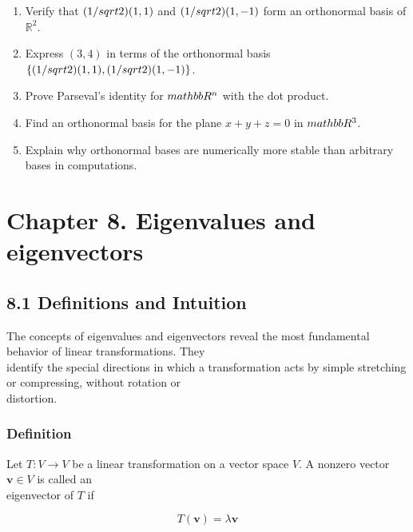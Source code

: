\documentclass[
  12pt,
  a4paper,
]{article}
\let\oldsection\section
\renewcommand{\section}{\clearpage\oldsection}
\begin{document}
\begin{enumerate}
\def\labelenumi{\arabic{enumi}.}
\item
  Verify that \((1/\\sqrt{2})(1,1)\) and \((1/\\sqrt{2})(1,-1)\) form an
  orthonormal basis of \(\mathbb{R}^2\).
\item
  Express \((3,4)\) in terms of the orthonormal basis
  \(\{(1/\\sqrt{2})(1,1), (1/\\sqrt{2})(1,-1)\}\).
\item
  Prove Parseval's identity for \(\\mathbb{R}^n\) with the dot product.
\item
  Find an orthonormal basis for the plane \(x+y+z=0\) in
  \(\\mathbb{R}^3\).
\item
  Explain why orthonormal bases are numerically more stable than
  arbitrary bases in computations.
\end{enumerate}

\section{Chapter 8. Eigenvalues and
eigenvectors}\label{chapter-8-eigenvalues-and-eigenvectors}

\subsection{8.1 Definitions and
Intuition}\label{81-definitions-and-intuition}

The concepts of eigenvalues and eigenvectors reveal the most fundamental
behavior of linear transformations. They\\
identify the special directions in which a transformation acts by simple
stretching or compressing, without rotation or\\
distortion.

\subsubsection{Definition}\label{definition-5}

Let \(T: V \to V\) be a linear transformation on a vector space \(V\). A
nonzero vector \(\mathbf{v} \in V\) is called an\\
eigenvector of \(T\) if

\[T(\mathbf{v}) = \lambda \mathbf{v}\]
\end{document}
